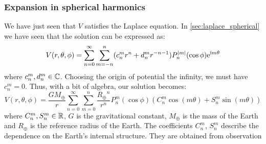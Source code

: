 \documentclass[../main.tex]{subfiles}
\begin{document}
\subsubsection{Expansion in spherical harmonics}
We have just seen that $V$ satisfies the Laplace equation. In \cref{sec:laplace_spherical} we have seen that the solution can be expressed as:
\begin{equation}\label{eq:sol_laplace}
  V(r,\theta,\phi) = \sum_{n=0}^\infty \sum_{m=-n}^n (c_{n}^m r^{n} +d_n^mr^{-n-1})P_n^\abs{m}(\cos\phi) \mathrm{e}^{\mathrm{i} m\theta}
\end{equation}
where $c_{n}^m,d_n^m\in\mathbb{C}$. Choosing the origin of potential the infinity, we must have $c_{n}^m=0$. Thus, with a bit of algebra, our solution becomes:
\begin{equation}\label{eq:sol_laplace}
  V(r,\theta,\phi) = \frac{GM_\oplus}{r}\sum_{n=0}^\infty \sum_{m=0}^n\frac{{R_\oplus}^n}{r^{n}}P_n^m(\cos\phi) (C_n^m\cos(m\theta)+S_n^m\sin(m\theta))
\end{equation}
where $C_n^m,S_n^m\in\mathbb{R}$, $G$ is the gravitational constant, $M_\oplus$ is the mass of the Earth and $R_\oplus$ is the reference radius of the Earth. The coefficients $C_n^m$, $S_n^m$ describe the dependence on the Earth's internal structure. They are obtained from observation
\end{document}
